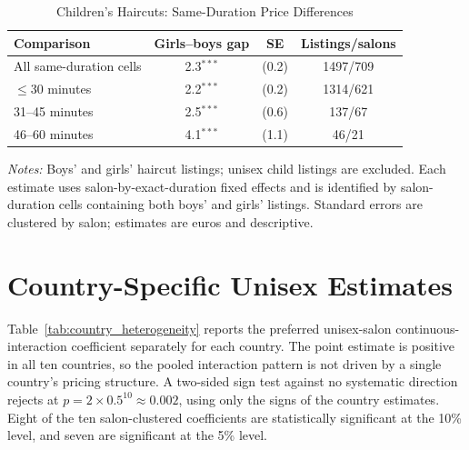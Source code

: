 \documentclass[12pt,a4paper]{article}
\begin{document}
\begin{table}[htbp]
  \centering
  \caption{Children's Haircuts: Same-Duration Price Differences}
  \label{tab:children_within_duration_gaps}
  \small
\begin{tabular}{lccc}
\hline
Comparison & Girls--boys gap & SE & Listings/salons \\
\hline
All same-duration cells & 2.3$^{***}$ & (0.2) & 1497/709 \\
\hline
$\leq$30 minutes & 2.2$^{***}$ & (0.2) & 1314/621 \\
31--45 minutes & 2.5$^{***}$ & (0.6) & 137/67 \\
46--60 minutes & 4.1$^{***}$ & (1.1) & 46/21 \\
\hline
\end{tabular}

\begin{minipage}{0.94\linewidth}
\footnotesize
\textit{Notes:} Boys' and girls' haircut listings; unisex child listings are excluded.
Each estimate uses salon-by-exact-duration fixed effects and is identified by salon-duration cells containing both boys' and girls' listings.
Standard errors are clustered by salon; estimates are euros and descriptive.
\end{minipage}
\end{table}

\newpage
\section{Country-Specific Unisex Estimates}
\label{app:country_heterogeneity}

Table~\ref{tab:country_heterogeneity} reports the preferred unisex-salon continuous-interaction coefficient separately for each country. The point estimate is positive in all ten countries, so the pooled interaction pattern is not driven by a single country's pricing structure. A two-sided sign test against no systematic direction rejects at $p = 2 \times 0.5^{10} \approx 0.002$, using only the signs of the country estimates. Eight of the ten salon-clustered coefficients are statistically significant at the 10\% level, and seven are significant at the 5\% level.
\end{document}
